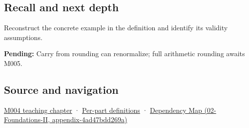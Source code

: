 \subsection{Recall and next depth}\label{appendix-614afe1de592-recall-and-next-depth}

Reconstruct the concrete example in the definition and identify its validity assumptions.

\textbf{Pending:} Carry from rounding can renormalize; full arithmetic rounding awaits M005.

\subsection{Source and navigation}\label{appendix-614afe1de592-source-and-navigation}

\hyperref[01-foundations-i-ch001-a-stretching-ruler-for-real-valued-quantities]{M004 teaching chapter} · \hyperref[appendix-fd090d982a15-m004---parts-61-76]{Per-part definitions} · \href{../02-Foundations-II/main.pdf\#nameddest=appendix-4ad47bdd269a}{Dependency Map (02-Foundations-II, appendix-4ad47bdd269a)}
